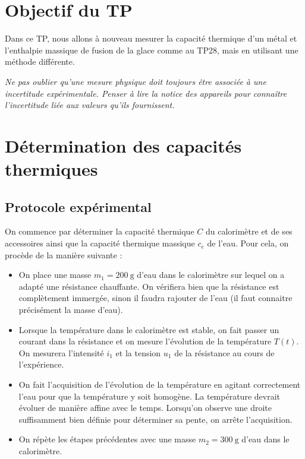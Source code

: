 \documentclass[]{tp}
\begin{document}

\section{Objectif du TP}
Dans ce TP, nous allons à nouveau mesurer la capacité thermique d'un métal et l'enthalpie massique de fusion de la glace comme au TP28, mais en utilisant une méthode différente.

\vspace{1em}
\textit{Ne pas oublier qu'une mesure physique doit toujours être associée à une incertitude expérimentale. Penser à lire la notice des appareils pour connaître l'incertitude liée aux valeurs qu'ils fournissent.}  

\section{Détermination des capacités thermiques}%
\label{capacite_thermique_calorimetre}
\subsection{Protocole expérimental}%
\label{sub:Protocole expérimental}

On commence par déterminer la capacité thermique $C$ du calorimètre et de ses accessoires ainsi que la capacité thermique massique $c_e$ de l'eau. Pour cela, on procède de la manière suivante :

\begin{itemize}
  \item On place une masse $m_1=\SI{200}{\gram}$ d'eau dans le calorimètre sur lequel on a adapté une résistance chauffante. On vérifiera bien que la résistance est complètement immergée, sinon il faudra rajouter de l'eau (il faut connaitre précisément la masse d'eau).

  \item Lorsque la température dans le calorimètre est stable, on fait passer un courant dans la résistance et on mesure l'évolution de la température $T(t)$. On mesurera l'intensité $i_1$ et la tension $u_1$ de la résistance au cours de l'expérience.

  \item On fait l'acquisition de l'évolution de la température en agitant correctement l'eau pour que la température y soit homogène. La température devrait évoluer de manière affine avec le temps. Lorsqu'on observe une droite suffisamment bien définie pour déterminer sa pente, on arrête l'acquisition.

  \item On répète les étapes précédentes avec une masse $m_2=\SI{300}{\gram}$ d'eau dans le calorimètre. 
\end{itemize}
\end{document}
